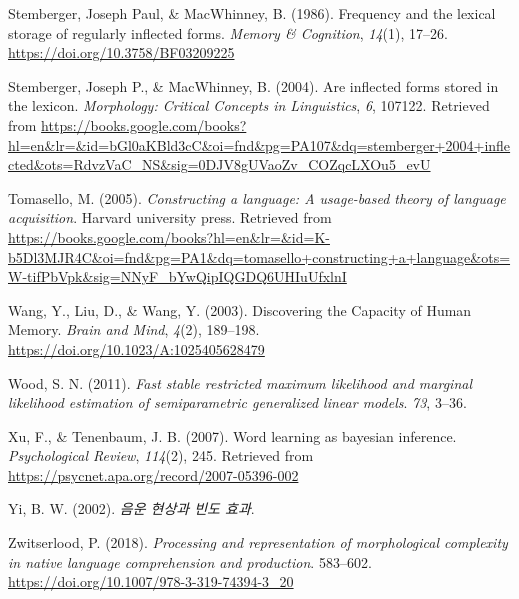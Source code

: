 \documentclass[
  man,floatsintext]{apa6}
\newlength{\cslhangindent}
\newlength{\cslentryspacingunit} %
\newenvironment{CSLReferences}[2] %
 {%
  \setlength{\parindent}{0pt}
  \ifodd #1
  \let\oldpar\par
  \def\par{\hangindent=\cslhangindent\oldpar}
  \fi
  \setlength{\parskip}{#2\cslentryspacingunit}
 }%
 {}
\begin{document}
\begin{CSLReferences}{1}{0}
\leavevmode{}%
Stemberger, Joseph Paul, \& MacWhinney, B. (1986). Frequency and the lexical storage of regularly inflected forms. \emph{Memory \& Cognition}, \emph{14}(1), 17--26. \url{https://doi.org/10.3758/BF03209225}

\leavevmode{}%
Stemberger, Joseph P., \& MacWhinney, B. (2004). Are inflected forms stored in the lexicon. \emph{Morphology: Critical Concepts in Linguistics}, \emph{6}, 107122. Retrieved from \url{https://books.google.com/books?hl=en\&lr=\&id=bGl0aKBld3cC\&oi=fnd\&pg=PA107\&dq=stemberger+2004+inflected\&ots=RdvzVaC_NS\&sig=0DJV8gUVaoZv_COZqcLXOu5_evU}

\leavevmode{}%
Tomasello, M. (2005). \emph{Constructing a language: A usage-based theory of language acquisition}. Harvard university press. Retrieved from \url{https://books.google.com/books?hl=en\&lr=\&id=K-b5Dl3MJR4C\&oi=fnd\&pg=PA1\&dq=tomasello+constructing+a+language\&ots=W-tifPbVpk\&sig=NNyF_bYwQipIQGDQ6UHIuUfxlnI}

\leavevmode{}%
Wang, Y., Liu, D., \& Wang, Y. (2003). Discovering the Capacity of Human Memory. \emph{Brain and Mind}, \emph{4}(2), 189--198. \url{https://doi.org/10.1023/A:1025405628479}

\leavevmode{}%
Wood, S. N. (2011). \emph{Fast stable restricted maximum likelihood and marginal likelihood estimation of semiparametric generalized linear models}. \emph{73}, 3--36.

\leavevmode{}%
Xu, F., \& Tenenbaum, J. B. (2007). Word learning as bayesian inference. \emph{Psychological Review}, \emph{114}(2), 245. Retrieved from \url{https://psycnet.apa.org/record/2007-05396-002}

\leavevmode{}%
Yi, B. W. (2002). \emph{음운 현상과 빈도 효과}.

\leavevmode{}%
Zwitserlood, P. (2018). \emph{Processing and representation of morphological complexity in native language comprehension and production}. 583--602. \url{https://doi.org/10.1007/978-3-319-74394-3_20}

\end{CSLReferences}
\end{document}
